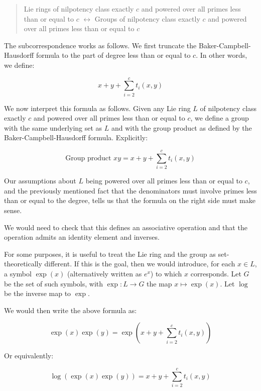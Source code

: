 \begin{quote}
Lie rings of nilpotency class exactly $c$ and powered over all primes
less than or equal to $c$ $\leftrightarrow$ Groups of nilpotency class
exactly $c$ and powered over all primes less than or equal to $c$
\end{quote}

The subcorrespondence works as follows. We first truncate the
Baker-Campbell-Hausdorff formula to the part of degree less than or
equal to $c$. In other words, we define:

\begin{equation*}
  x + y + \sum_{i=2}^c t_i(x,y)
\end{equation*}

We now interpret this formula as follows. Given any Lie ring $L$ of
nilpotency class exactly $c$ and powered over all primes less than or
equal to $c$, we define a group with the same underlying set as $L$
and with the group product as defined by the Baker-Campbell-Hausdorff formula. Explicitly:

\begin{equation*}
  \text{Group product } xy = x + y + \sum_{i=2}^c t_i(x,y)
\end{equation*}

Our assumptions about $L$ being powered over all primes less than or
equal to $c$, and the previously mentioned fact that the denominators
must involve primes less than or equal to the degree, tells us that
the formula on the right side must make sense.

We would need to check that this defines an associative operation and
that the operation admits an identity element and inverses.

For some purposes, it is useful to treat the Lie ring and the group as
set-theoretically different. If this is the goal, then we would
introduce, for each $x \in L$, a symbol $\exp(x)$ (alternatively
written as $e^x$) to which $x$ corresponds. Let $G$ be the set of such
symbols, with $\exp:L \to G$ the map $x \mapsto \exp(x)$. Let $\log$
be the inverse map to $\exp$.

We would then write the above formula as:

\begin{equation*}
   \exp(x)\exp(y) = \exp(x + y + \sum_{i=2}^c t_i(x,y))
\end{equation*}

Or equivalently:

\begin{equation*}
   \log(\exp(x)\exp(y)) = x + y + \sum_{i=2}^c t_i(x,y)
\end{equation*}

